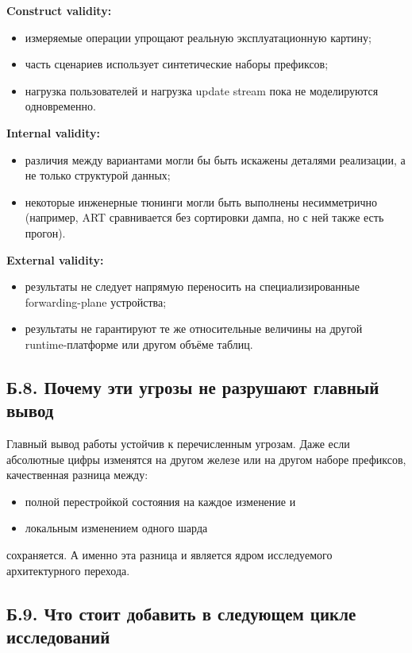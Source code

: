 \textbf{Construct validity:}

\begin{itemize}
\item измеряемые операции упрощают реальную эксплуатационную картину;
\item часть сценариев использует синтетические наборы префиксов;
\item нагрузка пользователей и нагрузка update stream пока не
моделируются одновременно.
\end{itemize}

\textbf{Internal validity:}

\begin{itemize}
\item различия между вариантами могли бы быть искажены деталями
реализации, а не только структурой данных;
\item некоторые инженерные тюнинги могли быть выполнены несимметрично
(например, ART сравнивается без сортировки дампа, но с ней также есть
прогон).
\end{itemize}

\textbf{External validity:}

\begin{itemize}
\item результаты не следует напрямую переносить на специализированные
forwarding-plane устройства;
\item результаты не гарантируют те же относительные величины на
другой runtime-платформе или другом объёме таблиц.
\end{itemize}

\subsection*{Б.8. Почему эти угрозы не разрушают главный вывод}

Главный вывод работы устойчив к перечисленным угрозам. Даже если
абсолютные цифры изменятся на другом железе или на другом наборе
префиксов, качественная разница между:

\begin{itemize}
\item полной перестройкой состояния на каждое изменение и
\item локальным изменением одного шарда
\end{itemize}

сохраняется. А именно эта разница и является ядром исследуемого
архитектурного перехода.

\subsection*{Б.9. Что стоит добавить в следующем цикле исследований}

